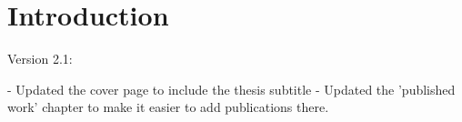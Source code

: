 \chapter{Introduction}

Version 2.1: 

- Updated the cover page to include the thesis subtitle
- Updated the 'published work' chapter to make it easier to add publications there.